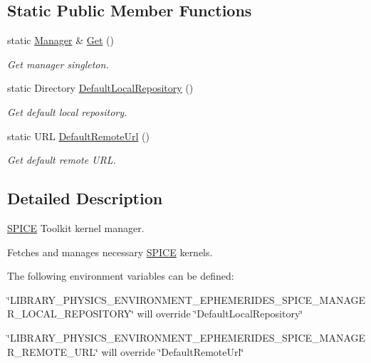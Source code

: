 \subsection*{Static Public Member Functions}
\begin{DoxyCompactItemize}
\item 
static \hyperlink{classlibrary_1_1physics_1_1env_1_1ephem_1_1spice_1_1_manager}{Manager} \& \hyperlink{classlibrary_1_1physics_1_1env_1_1ephem_1_1spice_1_1_manager_a3555b4555090b1140f1041d7e51ad640}{Get} ()
\begin{DoxyCompactList}\small\item\em Get manager singleton. \end{DoxyCompactList}\item 
static Directory \hyperlink{classlibrary_1_1physics_1_1env_1_1ephem_1_1spice_1_1_manager_afe6536dede2bc35e76a01ba12a203eb5}{Default\+Local\+Repository} ()
\begin{DoxyCompactList}\small\item\em Get default local repository. \end{DoxyCompactList}\item 
static U\+RL \hyperlink{classlibrary_1_1physics_1_1env_1_1ephem_1_1spice_1_1_manager_ae15505efd208b9e43550692f7620d40e}{Default\+Remote\+Url} ()
\begin{DoxyCompactList}\small\item\em Get default remote U\+RL. \end{DoxyCompactList}\end{DoxyCompactItemize}


\subsection{Detailed Description}
\hyperlink{classlibrary_1_1physics_1_1env_1_1ephem_1_1_s_p_i_c_e}{S\+P\+I\+CE} Toolkit kernel manager. 

Fetches and manages necessary \hyperlink{classlibrary_1_1physics_1_1env_1_1ephem_1_1_s_p_i_c_e}{S\+P\+I\+CE} kernels.

The following environment variables can be defined\+:


\begin{DoxyItemize}
\item \char`\"{}\+L\+I\+B\+R\+A\+R\+Y\+\_\+\+P\+H\+Y\+S\+I\+C\+S\+\_\+\+E\+N\+V\+I\+R\+O\+N\+M\+E\+N\+T\+\_\+\+E\+P\+H\+E\+M\+E\+R\+I\+D\+E\+S\+\_\+\+S\+P\+I\+C\+E\+\_\+\+M\+A\+N\+A\+G\+E\+R\+\_\+\+L\+O\+C\+A\+L\+\_\+\+R\+E\+P\+O\+S\+I\+T\+O\+R\+Y\char`\"{} will override \char`\"{}\+Default\+Local\+Repository\char`\"{}
\item \char`\"{}\+L\+I\+B\+R\+A\+R\+Y\+\_\+\+P\+H\+Y\+S\+I\+C\+S\+\_\+\+E\+N\+V\+I\+R\+O\+N\+M\+E\+N\+T\+\_\+\+E\+P\+H\+E\+M\+E\+R\+I\+D\+E\+S\+\_\+\+S\+P\+I\+C\+E\+\_\+\+M\+A\+N\+A\+G\+E\+R\+\_\+\+R\+E\+M\+O\+T\+E\+\_\+\+U\+R\+L\char`\"{} will override \char`\"{}\+Default\+Remote\+Url\char`\"{} 
\end{DoxyItemize}


